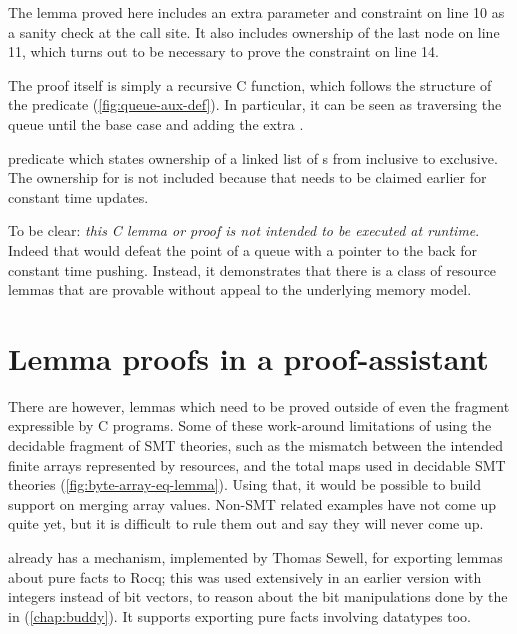 The lemma proved here includes an extra parameter and constraint on line 10 as
a sanity check at the call site. It also includes ownership of the last node on
line 11, which turns out to be necessary to prove the constraint on line 14.


The proof itself is simply a recursive C function, which follows the structure
of the  predicate (\cref{fig:queue-aux-def}). In particular,
it can be seen as traversing the queue until the base case and adding the extra
.

\begin{marginfigure}
    \caption{ predicate which states ownership of a linked
    list of s from  inclusive to
     exclusive. The ownership for  is
    not included because that needs to be claimed earlier for constant time
    updates.}\label{fig:queue-aux-def}
\end{marginfigure}

To be clear: \emph{this C lemma or proof is not intended to be executed at
runtime}. Indeed that would defeat the point of a queue with a pointer to the
back for constant time pushing. Instead, it demonstrates that there is a class
of resource lemmas that are provable without appeal to the underlying memory
model.

\section{Lemma proofs in a proof-assistant}\label{sec:lemma-prover}

There are however, lemmas which need to be proved outside of even the fragment
expressible by C programs. Some of these work-around limitations of using the
decidable fragment of SMT theories, such as the mismatch between the intended
finite arrays represented by resources, and the total maps used in decidable
SMT theories (\cref{fig:byte-array-eq-lemma}). Using that, it would be possible
to build support on merging array values. Non-SMT related examples have not
come up quite yet, but it is difficult to rule them out and say they will never
come up.

 already has a mechanism, implemented by Thomas Sewell, for exporting
lemmas about pure facts to Rocq; this was used extensively in an earlier version
with integers instead of bit vectors, to reason about the bit manipulations done
by the  in  (\cref{chap:buddy}). It supports
exporting pure facts involving datatypes too.

